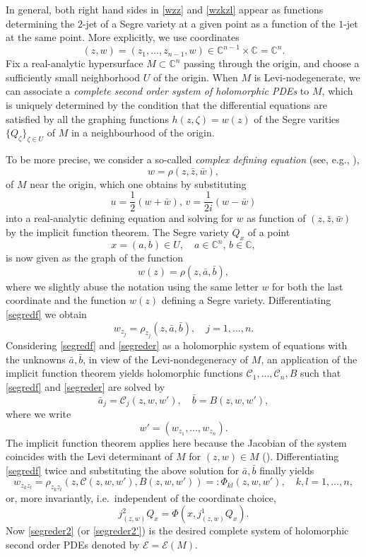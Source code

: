 \documentclass[12pt]{amsart}
\def\CC{\mathbb{C}}
\def\cal{\mathcal}
\begin{document}
In general, both right hand sides in \eqref{wzz} and \eqref{wzkzl} appear as functions determining the $2$-jet of a Segre variety 
at a given point
as a function of the $1$-jet at the same point.
More explicitly, we use coordinates
$$
	(z,w)=(z_1, \ldots, z_{n-1},w) \in \CC^{n-1}\times \CC{} = \CC^{n}.
$$ 
Fix a 
 real-analytic
hypersurface
 $M\subset\CC^{n}$
 passing through the origin, 
 and choose a 
sufficiently small neighborhood $U$
 of the origin.
  When $M$ is Levi-nodegenerate, we can associate a 
{\em complete second order system of holomorphic PDEs}
 to $M$,
which is uniquely determined by the condition that the differential equations are satisfied by all the
graphing functions $h(z,\zeta) = w(z)$ of the
Segre varities $\{Q_\zeta\}_{\zeta\in U}$ of $M$ in a
neighbourhood of the origin.

To be more precise, we consider a
so-called {\em  complex defining
 equation } (see, e.g., \cite{ber}),
$$
w=\rho(z,\bar z,\bar w),
$$ 
of $M$ near the origin, which one
obtains by substituting 
$$u=\frac{1}{2}(w+\bar w),\,v=\frac{1}{2i}(w-\bar w)$$ 
into 
a real-analytic defining equation and
solving for $w$ as function of $(z,\bar z, \bar w)$
by the implicit function theorem.
 The Segre
variety $Q_x$ of a point 
$$x=(a,b)\in U,\quad
a\in\CC^{n},\,b\in\CC{},$$ 
is  now given
as the graph of the function
\begin{equation} 
\label{segredf}
w (z)=\rho(z,\bar a,\bar b), 
\end{equation}
where we slightly abuse the notation
using the same letter $w$ for 
both the last coordinate and
the function $w(z)$ defining a Segre variety.
Differentiating \eqref{segredf} we obtain
\begin{equation}\label{segreder} 
	w_{z_j}=\rho_{z_j}(z,\bar a,\bar b),
	\quad
	j=1,\ldots,n. 
\end{equation}
Considering \eqref{segredf} and \eqref{segreder}  as a holomorphic
system of equations with the unknowns $\bar a,\bar b$, 
in view of the Levi-nondegeneracy of $M$,
an
application of the implicit function theorem yields holomorphic functions
 ${\cal C}_1,...,{\cal C}_n, B$ such that
 \eqref{segredf} and \eqref{segreder} are solved by
$$
	\bar a_j={\cal C}_j(z,w,w'),\quad
	\bar b=B(z,w,w'),
$$
where we write
$$
	w' = (w_{z_1},  \ldots, w_{z_n}).
$$
The implicit function theorem applies here because the
Jacobian of the system coincides with the Levi determinant of $M$
for $(z,w)\in M$ (\cite{ber}). Differentiating \eqref{segredf} twice
and substituting the above solution for $\bar a,\bar b$ finally
yields
\begin{equation}\label{segreder2}
w_{z_kz_l}=\rho_{z_kz_l}(z,{\cal C} (z,w,w'),
B(z,w,w'))=:\Phi_{kl}(z,w,w'),
\quad
k,l=1, \ldots, n,
\end{equation}
or, more invariantly,
i.e.\ independent of the coordinate choice,
\begin{equation}\label{segreder2'}
	j^2_{(z,w)} Q_x = \Phi(x, j^1_{(z,w)} Q_x).
\end{equation}
Now \eqref{segreder2}
(or \eqref{segreder2'})
is the desired complete system of holomorphic second order PDEs
denoted by $\mathcal E = \mathcal{E}(M)$.
\smallskip
\end{document}
